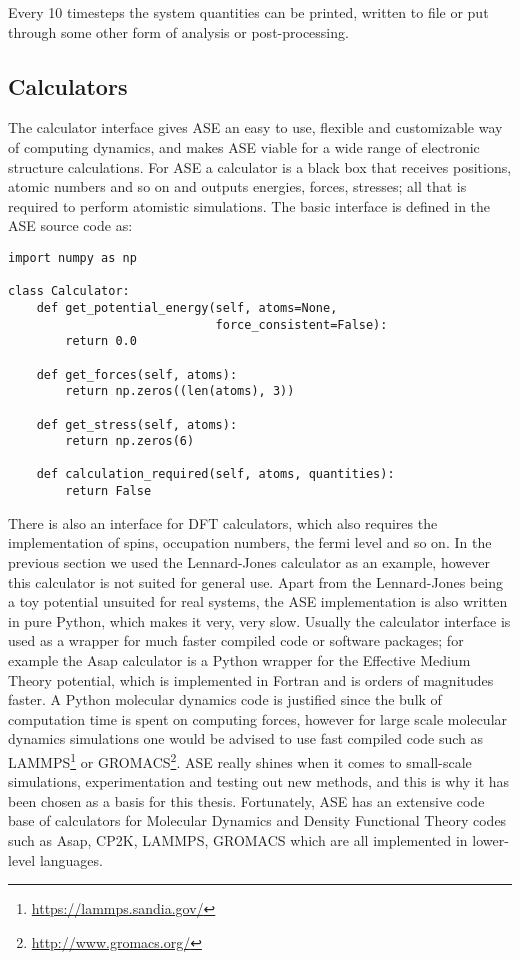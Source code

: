 Every 10 timesteps the system quantities can be printed, written to file
or put through some other form of analysis or post-processing.

\subsection{Calculators}
The calculator interface gives ASE an easy to use,
flexible and customizable way of computing dynamics,
and makes ASE viable for a wide range of electronic structure calculations.
For ASE a calculator is a black box that receives positions, atomic
numbers and so on and outputs energies, forces, stresses;
all that is required to perform atomistic simulations.
The basic interface is defined in the ASE source code as:

\begin{verbatim}
import numpy as np

class Calculator:
    def get_potential_energy(self, atoms=None, 
                             force_consistent=False):
        return 0.0

    def get_forces(self, atoms):
        return np.zeros((len(atoms), 3))

    def get_stress(self, atoms):
        return np.zeros(6)

    def calculation_required(self, atoms, quantities):
        return False
\end{verbatim}

There is also an interface for DFT calculators, which also
requires the implementation of spins, occupation numbers,
the fermi level and so on.
\newline
\newline
In the previous section we used the Lennard-Jones calculator
as an example, however this calculator is not suited for general use.
Apart from the Lennard-Jones being a toy potential unsuited
for real systems, the ASE implementation is also written in pure
Python, which makes it very, very slow.
Usually the calculator interface is used as a wrapper for much faster
compiled code or software packages; for example the
Asap calculator is a Python wrapper for the Effective Medium Theory
potential, which is implemented in Fortran and is orders of magnitudes
faster. A Python molecular dynamics code is justified
since the bulk of computation time is spent on computing forces,
however for large scale molecular dynamics simulations
one would be advised to use fast compiled code such as LAMMPS\footnote{
\url{https://lammps.sandia.gov/}} or GROMACS\footnote{
\url{http://www.gromacs.org/}}.
ASE really shines when it comes to small-scale simulations,
experimentation and testing out new methods, and this is why
it has been chosen as a basis for this thesis.
Fortunately, ASE has an extensive code base of calculators
for Molecular Dynamics and Density Functional Theory codes
such as Asap, CP2K, LAMMPS, GROMACS which are all
implemented in lower-level languages.
